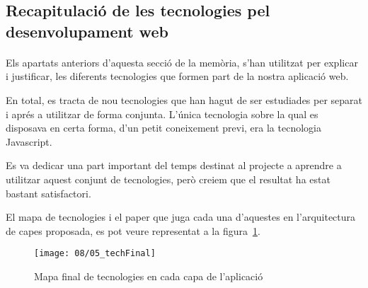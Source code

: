 \subsection{Recapitulació de les tecnologies pel desenvolupament web}

    \paragraph{}
    Els apartats anteriors d'aquesta secció de la memòria, s'han utilitzat per explicar i justificar, les diferents tecnologies que formen part de la nostra aplicació web.

    En total, es tracta de nou tecnologies que han hagut de ser estudiades per separat i aprés a utilitzar de forma conjunta. L'única tecnologia sobre la qual es disposava en certa forma, d'un petit coneixement previ, era la tecnologia Javascript.

    Es va dedicar una part important del temps destinat al projecte a aprendre a utilitzar aquest conjunt de tecnologies, però creiem que el resultat ha estat bastant satisfactori.

    El mapa de tecnologies i el paper que juga cada una d'aquestes en l'arquitectura de capes proposada, es pot veure representat a la figura~\ref{fig:finalTech}.

    \begin{figure}[h]
        \texttt{[image: 08/05\_techFinal]}
        \centering
        \caption{Mapa final de tecnologies en cada capa de l'aplicació}\label{fig:finalTech}
    \end{figure}

